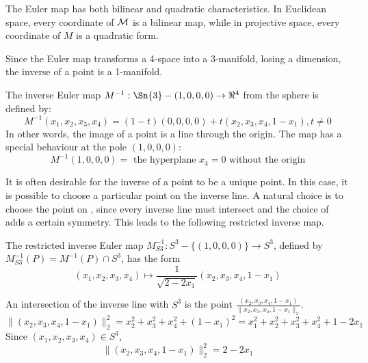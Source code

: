 \documentclass[11pt]{article}
\begin{document}
The Euler map has both bilinear and quadratic characteristics.
In Euclidean space, every coordinate of ${\cal M}$ is a bilinear map,
while in projective space, every coordinate of $M$ is a quadratic form.

Since the Euler map transforms a 4-space into a 3-manifold, losing a dimension,
the inverse of a point is a 1-manifold.

\begin{lemma}
\label{lem:inverse}
The inverse Euler map $M^{-1}: \Sn{3} - (1,0,0,0) \rightarrow \Re^4$ from the sphere
is defined by:
\begin{equation}
M^{-1}(x_1,x_2,x_3,x_4) = (1-t)(0,0,0,0) + t(x_2,x_3,x_4,1-x_1), t \neq 0
\end{equation}
In other words, the image of a point is a line through the origin.
The map has a special behaviour at the pole $(1,0,0,0)$:
\begin{equation}
M^{-1}(1,0,0,0) = \mbox{ the hyperplane $x_4=0$ without the origin}
\end{equation}
\end{lemma}
\prf
\QED

It is often desirable for the inverse of a point to be a unique point.
In this case, it is possible to choose a particular point on the inverse line.
A natural choice is to choose the point on , since every inverse line must intersect
 and the choice of  adds a certain symmetry.
This leads to the following restricted inverse map.

\begin{lemma}
The restricted inverse Euler map $M^{-1}_{S3}: S^3 - \{(1,0,0,0)\} \rightarrow S^3$,
defined by $M^{-1}_{S3}(P) = M^{-1}(P) \cap S^3$, has the form
\begin{equation}
(x_1,x_2,x_3,x_4) \mapsto \frac{1}{\sqrt{2-2x_1}}(x_2,x_3,x_4,1-x_1)
\end{equation}
\end{lemma}
\prf
An intersection of the inverse line with $S^3$
is the point $\frac{(x_2,x_3,x_4,1-x_1)}{\|x_2,x_3,x_4,1-x_1\|_2}$.
\[
\|(x_2,x_3,x_4,1-x_1)\|_2^2 = x_2^2 + x_3^2 + x_4^2 + (1-x_1)^2
= x_1^2 + x_2^2 + x_3^2 + x_4^2 + 1 - 2x_1
\]
Since $(x_1,x_2,x_3,x_4) \in S^3$,
\[
\|(x_2,x_3,x_4,1-x_1)\|_2^2 = 2 - 2x_1
\]
\QED

\end{document}
